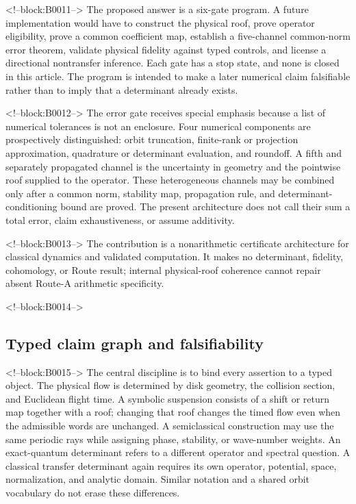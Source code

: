 \documentclass[11pt,a4paper]{article}
\begin{document}
<!--block:B0011-->
The proposed answer is a six-gate program. A future implementation would have to construct the physical roof, prove operator eligibility, prove a common coefficient map, establish a five-channel common-norm error theorem, validate physical fidelity against typed controls, and license a directional nontransfer inference. Each gate has a stop state, and none is closed in this article. The program is intended to make a later numerical claim falsifiable rather than to imply that a determinant already exists.

<!--block:B0012-->
The error gate receives special emphasis because a list of numerical tolerances is not an enclosure. Four numerical components are prospectively distinguished: orbit truncation, finite-rank or projection approximation, quadrature or determinant evaluation, and roundoff. A fifth and separately propagated channel is the uncertainty in geometry and the pointwise roof supplied to the operator. These heterogeneous channels may be combined only after a common norm, stability map, propagation rule, and determinant-conditioning bound are proved. The present architecture does not call their sum a total error, claim exhaustiveness, or assume additivity.

<!--block:B0013-->
The contribution is a nonarithmetic certificate architecture for classical dynamics and validated computation. It makes no determinant, fidelity, cohomology, or Route result; internal physical-roof coherence cannot repair absent Route-A arithmetic specificity.

<!--block:B0014-->
\subsection{Typed claim graph and falsifiability}

<!--block:B0015-->
The central discipline is to bind every assertion to a typed object. The physical flow is determined by disk geometry, the collision section, and Euclidean flight time. A symbolic suspension consists of a shift or return map together with a roof; changing that roof changes the timed flow even when the admissible words are unchanged. A semiclassical construction may use the same periodic rays while assigning phase, stability, or wave-number weights. An exact-quantum determinant refers to a different operator and spectral question. A classical transfer determinant again requires its own operator, potential, space, normalization, and analytic domain. Similar notation and a shared orbit vocabulary do not erase these differences.
\end{document}
